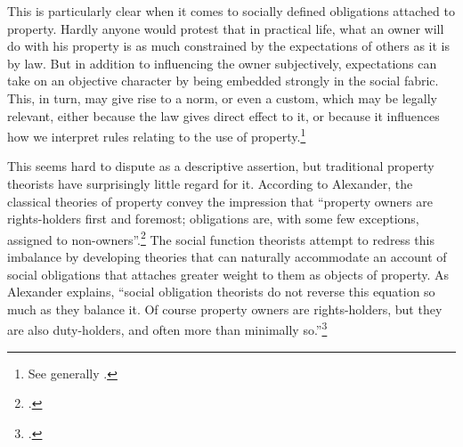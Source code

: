 \documentclass[12pt,a4paper]{book} %
\begin{document}
This is particularly clear when it comes to socially defined obligations attached to property. Hardly anyone would protest that in practical life, what an owner will do with his property is as much constrained by the expectations of others as it is by law. But in addition to influencing the owner subjectively, expectations can take on an objective character by being embedded strongly in the social fabric. This, in turn, may give rise to a norm, or even a custom, which may be legally relevant, either because the law gives direct effect to it, or because it influences how we interpret rules relating to the use of property.\footnote{See generally \cite{penalver09,alexander09}.}

This seems hard to dispute as a descriptive assertion, but traditional property theorists have surprisingly little regard for it. According to Alexander, the classical theories of property convey the impression that ``property owners are rights-holders first and foremost; obligations are, with some few exceptions, assigned to non-owners''.\footcite[1023]{alexander11} The social function theorists attempt to redress this imbalance by developing theories that can naturally accommodate an account of social obligations that attaches greater weight to them as objects of property. As Alexander explains, ``social obligation theorists do not reverse this equation so much as they balance it. Of course property owners are rights-holders, but they are also duty-holders, and often more than minimally so.''\footcite[1023]{alexander11} 
\end{document}
